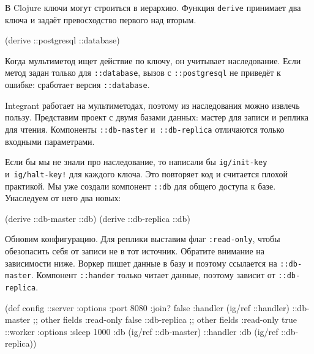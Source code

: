 
В Clojure ключи могут строиться в иерархию. Функция \verb|derive| принимает
два ключа и задаёт превосходство первого над вторым.


\begin{english}
  \begin{clojure}
(derive ::postgresql ::database)
  \end{clojure}
\end{english}

\mnoindent
Когда мультиметод ищет действие по ключу, он учитывает наследование. Если метод
задан только для \verb|::database|, вызов с \verb|::postgresql| не приведёт к
ошибке: сработает версия \verb|::database|.

Integrant работает на мультиметодах, поэтому из наследования можно извлечь
пользу. Представим проект с двумя базами данных: мастер для записи и реплика для
чтения. Компоненты \verb|::db-master| и~\verb|::db-replica| отличаются только
входными параметрами.

Если бы мы не знали про наследование, то написали бы \verb|ig/init-key|
и~\verb|ig/halt-key!| для каждого ключа. Это повторяет код и считается плохой
практикой. Мы уже создали компонент \verb|::db| для общего доступа к
базе. Унаследуем от него два новых:

\begin{english}
  \begin{clojure}
(derive ::db-master ::db)
(derive ::db-replica ::db)
  \end{clojure}
\end{english}

Обновим конфигурацию. Для реплики выставим флаг \texttt{:read\--only}, чтобы
обезопасить себя от записи не в тот источник. Обратите внимание на зависимости
ниже. Воркер пишет данные в базу и поэтому ссылается на
\verb|::db-master|. Компонент \verb|::hander| только читает данные,
поэтому зависит от \verb|::db-replica|.

\ifnarrow

\begin{english}
  \begin{clojure}
(def config
  {::server {:options {:port 8080
                       :join? false}
             :handler (ig/ref ::handler)}
   ::db-master {;; other fields
                :read-only false}
   ::db-replica {;; other fields
                 :read-only true}
   ::worker {:options {:sleep 1000}
             :db (ig/ref ::db-master)}
   ::handler {:db (ig/ref
                    ::db-replica)}})
  \end{clojure}
\end{english}

